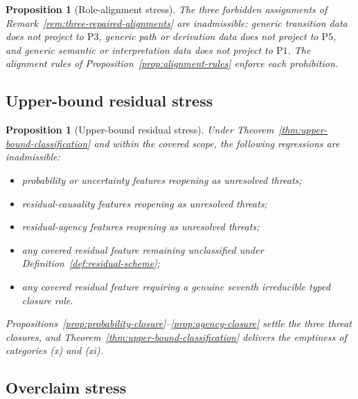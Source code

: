 \documentclass[11pt]{article}
\newtheorem{proposition}[theorem]{Proposition}
\theoremstyle{definition}
\newcommand{\Pone}{\ensuremath{\mathrm{P1}}}
\newcommand{\Pthree}{\ensuremath{\mathrm{P3}}}
\newcommand{\Pfive}{\ensuremath{\mathrm{P5}}}
\begin{document}
\begin{proposition}[Role-alignment stress]\label{prop:role-alignment-stress}
The three forbidden assignments of
Remark~\ref{rem:three-repaired-alignments} are inadmissible: generic
transition data does not project to \Pthree{}, generic path or
derivation data does not project to \Pfive{}, and generic semantic or
interpretation data does not project to \Pone{}. The alignment rules
of Proposition~\ref{prop:alignment-rules} enforce each prohibition.
\end{proposition}

\subsection{Upper-bound residual stress}\label{subsec:upper-bound-residual-stress}

\begin{proposition}[Upper-bound residual stress]\label{prop:residual-stress}
Under Theorem~\ref{thm:upper-bound-classification} and within the covered
scope, the following regressions are inadmissible:
\begin{itemize}[topsep=2pt,itemsep=1pt]
  \item probability or uncertainty features reopening as unresolved
    threats;
  \item residual-causality features reopening as unresolved threats;
  \item residual-agency features reopening as unresolved threats;
  \item any covered residual feature remaining unclassified under
    Definition~\ref{def:residual-scheme};
  \item any covered residual feature requiring a genuine seventh
    irreducible typed closure role.
\end{itemize}
Propositions~\ref{prop:probability-closure}--\ref{prop:agency-closure}
settle the three threat closures, and
Theorem~\ref{thm:upper-bound-classification} delivers the emptiness of
categories (x) and (xi).
\end{proposition}

\subsection{Overclaim stress}\label{subsec:overclaim-stress}
\end{document}
